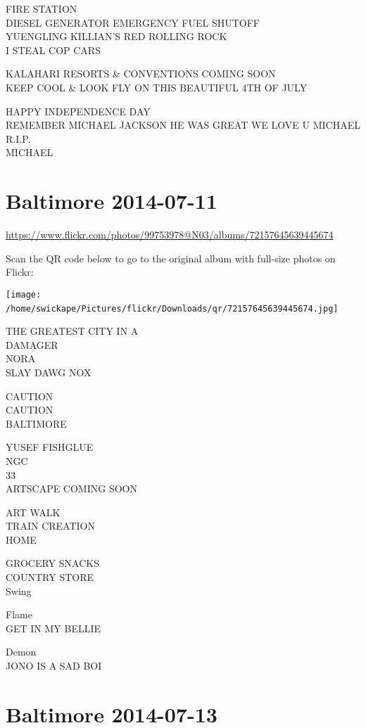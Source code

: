 \documentclass[10pt,letterpaper]{article}
\begin{document}
FIRE STATION\\
DIESEL GENERATOR EMERGENCY FUEL SHUTOFF\\
YUENGLING KILLIAN'S RED ROLLING ROCK\\
I STEAL COP CARS

KALAHARI RESORTS \& CONVENTIONS COMING SOON\\
KEEP COOL \& LOOK FLY ON THIS BEAUTIFUL 4TH OF JULY

HAPPY INDEPENDENCE DAY\\
REMEMBER MICHAEL JACKSON HE WAS GREAT WE LOVE U MICHAEL R.I.P.\\
MICHAEL
\

\section*{Baltimore 2014-07-11}

\url{https://www.flickr.com/photos/99753978@N03/albums/72157645639445674}

Scan the QR code below to go to the original album with full-size photos on Flickr:

\texttt{[image: /home/swickape/Pictures/flickr/Downloads/qr/72157645639445674.jpg]}
\

THE GREATEST CITY IN A\\
DAMAGER\\
NORA\\
SLAY DAWG NOX

CAUTION\\
CAUTION\\
BALTIMORE

YUSEF FISHGLUE\\
NGC\\
33\\
ARTSCAPE COMING SOON

ART WALK\\
TRAIN CREATION\\
HOME

GROCERY SNACKS\\
COUNTRY STORE\\
Swing

Flame\\
GET IN MY BELLIE

Demon\\
JONO IS A SAD BOI
\

\section*{Baltimore 2014-07-13}
\end{document}
